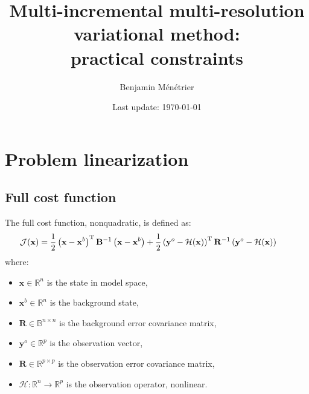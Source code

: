 \documentclass[12pt]{scrartcl}
\begin{document}
\title{\vspace{-1.2cm}Multi-incremental multi-resolution variational method:\\ practical constraints}
\author{Benjamin Ménétrier}
\date{Last update: \today\vspace{-0.5cm}}

\thispagestyle{empty}

\maketitle

\tableofcontents

\clearpage

\section{Problem linearization}

\subsection{Full cost function}
The full cost function, nonquadratic, is defined as:
\begin{align}
\hspace{-0.7cm} \mathcal{J}(\mathbf{x}) = \frac{1}{2} \left(\mathbf{x}-\mathbf{x}^b\right)^\mathrm{T} \mathbf{B}^{-1} \left(\mathbf{x}-\mathbf{x}^b\right) + \frac{1}{2} \left(\mathbf{y}^o-\mathcal{H}(\mathbf{x})\right)^\mathrm{T} \mathbf{R}^{-1} \left(\mathbf{y}^o-\mathcal{H}(\mathbf{x})\right)
\end{align}
where:
\begin{itemize}
\item $\mathbf{x} \in \mathbb{R}^n$ is the state in model space,
\item $\mathbf{x}^b \in \mathbb{R}^n$ is the background state,
\item $\mathbf{R} \in \mathbb{B}^{n \times n}$ is the background error covariance matrix,
\item $\mathbf{y}^o \in \mathbb{R}^p$ is the observation vector,
\item $\mathbf{R} \in \mathbb{R}^{p \times p}$ is the observation error covariance matrix,
\item $\mathcal{H} : \mathbb{R}^n \rightarrow \mathbb{R}^p$ is the observation operator, nonlinear.
\end{itemize}
\end{document}
